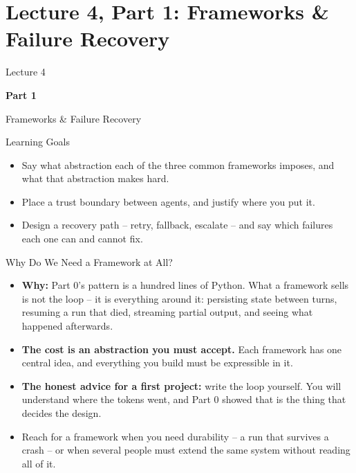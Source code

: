 \section{Lecture 4, Part 1: Frameworks \& Failure Recovery}

\begin{frame}
\vfill
\centering
{\color{RLBlue}\large Lecture 4}

\vspace{0.3em}
{\color{RLBlue}\Large\bfseries Part 1}

\vspace{0.6em}
{\Large Frameworks \& Failure Recovery}
\vfill
\end{frame}

\begin{frame}{Learning Goals}
\begin{itemize}
  \item Say what abstraction each of the three common frameworks imposes, and what that abstraction makes hard.
  \pause
  \item Place a trust boundary between agents, and justify where you put it.
  \pause
  \item Design a recovery path -- retry, fallback, escalate -- and say which failures each one can and cannot fix.
\end{itemize}
\end{frame}

\begin{frame}{Why Do We Need a Framework at All?}
\begin{itemize}
  \item \textbf{Why:} Part 0's pattern is a hundred lines of Python. What a framework sells is not the loop -- it is everything around it: persisting state between turns, resuming a run that died, streaming partial output, and seeing what happened afterwards.
  \pause
  \item \textbf{The cost is an abstraction you must accept.} Each framework has one central idea, and everything you build must be expressible in it.
  \pause
  \item \textbf{The honest advice for a first project:} write the loop yourself. You will understand where the tokens went, and Part 0 showed that is the thing that decides the design.
  \pause
  \item Reach for a framework when you need durability -- a run that survives a crash -- or when several people must extend the same system without reading all of it.
\end{itemize}
\end{frame}

